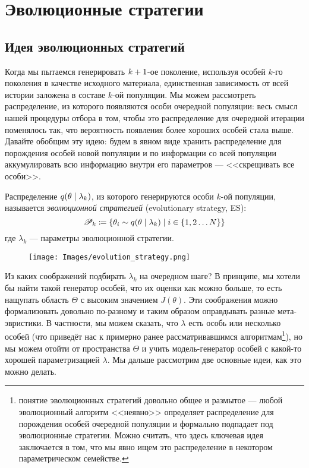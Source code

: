 \section{Эволюционные стратегии}

\subsection{Идея эволюционных стратегий}

Когда мы пытаемся генерировать $k \HM+ 1$-ое поколение, используя особей $k$-го поколения в качестве исходного материала, единственная зависимость от всей истории заложена в составе $k$-ой популяции. Мы можем рассмотреть распределение, из которого появляются особи очередной популяции: весь смысл нашей процедуры отбора в том, чтобы это распределение для очередной итерации поменялось так, что вероятность появления более хороших особей стала выше. Давайте обобщим эту идею: будем в явном виде хранить распределение для порождения особей новой популяции и по информации со всей популяции аккумулировать всю информацию внутри его параметров --- <<скрещивать все особи>>.

\begin{definition}
Распределение $q(\theta \HM\mid \lambda_k)$, из которого генерируются особи $k$-ой популяции, называется \emph{эволюционной стратегией} (evolutionary strategy, ES):
$$\Pop_{k} \coloneqq \{\theta_i \sim q(\theta \HM\mid \lambda_k) \mid i \in \{1, 2 \dots N\} \}$$
где $\lambda_k$ --- параметры эволюционной стратегии.
\end{definition}

\begin{wrapfigure}{r}{0.4\textwidth}
\centering
\vspace{-0.6cm}
\texttt{[image: Images/evolution\_strategy.png]}
\vspace{-0.5cm}
\end{wrapfigure}

Из каких соображений подбирать $\lambda_k$ на очередном шаге? В принципе, мы хотели бы найти такой генератор особей, что их оценки как можно больше, то есть нащупать область $\Theta$ с высоким значением $J(\theta)$. Эти соображения можно формализовать довольно по-разному и таким образом оправдывать разные мета-эвристики. В частности, мы можем сказать, что $\lambda$ есть особь или несколько особей (что приведёт нас к примерно ранее рассматривавшимся алгоритмам\footnote{понятие эволюционных стратегий довольно общее и размытое --- любой эволюционный алгоритм <<неявно>> определяет распределение для порождения особей очередной популяции и формально подпадает под эволюционные стратегии. Можно считать, что здесь ключевая идея заключается в том, что мы явно ищем это распределение в некотором параметрическом семействе.}), но мы можем отойти от пространства $\Theta$ и учить модель-генератор особей с какой-то хорошей параметризацией $\lambda$. Мы дальше рассмотрим две основные идеи, как это можно делать.

